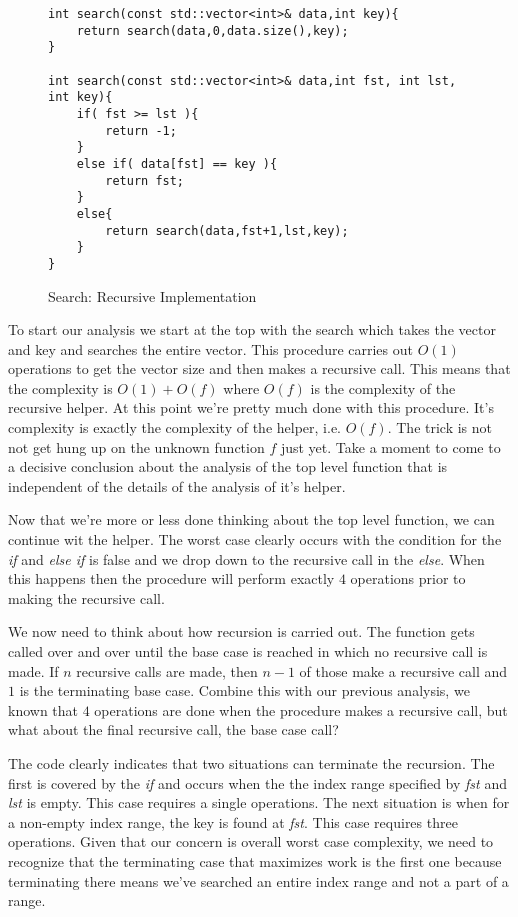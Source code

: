 \documentclass[nobib]{tufte-handout}
\begin{document}
\begin{figure}[htpb!]
\begin{lstlisting}
int search(const std::vector<int>& data,int key){
	return search(data,0,data.size(),key);
}

int search(const std::vector<int>& data,int fst, int lst, int key){
	if( fst >= lst ){
		return -1;
	}
	else if( data[fst] == key ){
		return fst;
	}
	else{
		return search(data,fst+1,lst,key);
	}
}
\end{lstlisting}
\label{code:searchrec}
\caption{Search: Recursive Implementation}
\end{figure}

To start our analysis we start at the top with the search which takes the vector and key and searches the entire vector. This procedure carries out $O(1)$ operations to get the vector size and then makes a recursive call. This means that the complexity is $O(1) + O(f)$ where $O(f)$ is the complexity of the recursive helper. At this point we're pretty much done with this procedure.  It's complexity is exactly the complexity of the helper, i.e. $O(f)$. The trick is not not get hung up on the unknown function $f$ just yet. Take a moment to come to a decisive conclusion about the analysis of the top level function that is independent of the details of the analysis of it's helper.

Now that we're more or less done thinking about the top level function, we can continue wit the helper. The worst case clearly occurs with the condition for the \textit{if} and \textit{else if} is false and we drop down to the recursive call in the \textit{else}.  When this happens then the procedure will perform exactly $4$ operations prior to making the recursive call.

We now need to think about how recursion is carried out. The function gets called over and over until the base case is reached in which no recursive call is made. If $n$ recursive calls are made, then $n-1$ of those make a recursive call and $1$ is the terminating base case. Combine this with our previous analysis, we known that $4$ operations are done when the procedure makes a recursive call, but what about the final recursive call, the base case call?

The code clearly indicates that two situations can terminate the recursion. The first is covered by the \textit{if} and occurs when the the index range specified by \textit{fst} and \textit{lst} is empty. This case requires a single operations. The next situation is when for a non-empty index range, the key is found at \textit{fst}. This case requires three operations. Given that our concern is overall worst case complexity, we need to recognize that the terminating case that maximizes work is the first one because terminating there means we've searched an entire index range and not a part of a range.
\end{document}
